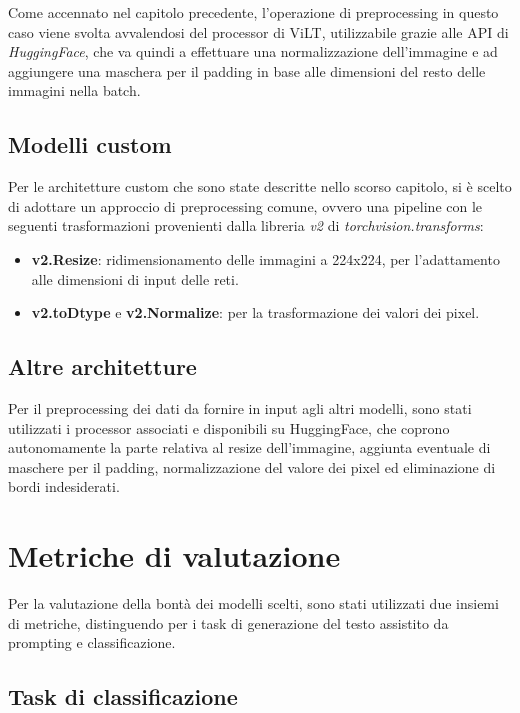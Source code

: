 \documentclass[../main.tex]{subfiles}
\begin{document}
Come accennato nel capitolo precedente, l'operazione di preprocessing in questo caso viene svolta avvalendosi del processor di ViLT, utilizzabile grazie alle API di \textit{HuggingFace}, che va quindi a effettuare una normalizzazione dell'immagine e ad aggiungere una maschera per il padding in base alle dimensioni del resto delle immagini nella batch.

\subsection{Modelli custom}

Per le architetture custom che sono state descritte nello scorso capitolo, si è scelto di adottare un approccio di preprocessing comune, ovvero una pipeline con le seguenti trasformazioni provenienti dalla libreria \textit{v2} di \textit{torchvision.transforms}:

\begin{itemize}
    \item \textbf{v2.Resize}: ridimensionamento delle immagini a 224x224, per l'adattamento alle dimensioni di input delle reti.
    \item \textbf{v2.toDtype} e \textbf{v2.Normalize}: per la trasformazione dei valori dei pixel.
\end{itemize}

\subsection{Altre architetture}

Per il preprocessing dei dati da fornire in input agli altri modelli, sono stati utilizzati i processor associati e disponibili su HuggingFace, che coprono autonomamente la parte relativa al resize dell'immagine, aggiunta eventuale di maschere per il padding, normalizzazione del valore dei pixel ed eliminazione di bordi indesiderati.

\section{Metriche di valutazione}

Per la valutazione della bontà dei modelli scelti, sono stati utilizzati due insiemi di metriche, distinguendo per i task di generazione del testo assistito da prompting e classificazione.

\subsection{Task di classificazione}
\end{document}

